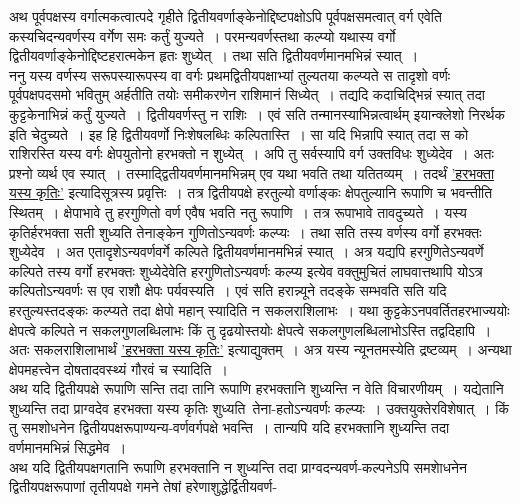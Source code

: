 \documentclass[11pt, openany]{book}
\begin{document}
\newpage

\begin{sloppypar}
अथ पूर्वपक्षस्य वर्गात्मकत्वात्पदे गृहीते द्वितीयवर्णाङ्केनोद्दिष्टपक्षोऽपि पूर्वपक्षसमत्वात् वर्ग एवेति कस्यचिदन्यवर्णस्य वर्गेण समः कर्तुं युज्यते~। परमन्यवर्णस्तथा कल्प्यो यथास्य वर्गो द्वितीयवर्णाङ्केनोद्दिष्टहरात्मकेन हृतः शुध्येत्~। तथा सति द्वितीयवर्णमानमभिन्नं स्यात्~।\\

ननु यस्य वर्णस्य सरूपस्यारूपस्य वा वर्गः प्रथमद्वितीयपक्षाभ्यां तुल्यतया कल्प्यते स तादृशो वर्णः पूर्वपक्षपदसमो भवितुम् अर्हतीति तयोः समीकरणेन राशिमानं सिध्येत्~। तद्यदि कदाचिद्भिन्नं स्यात् तदा कुट्टकेनाभिन्नं कर्तुं युज्यते~। द्वितीयवर्णस्तु न राशिः~। एवं सति तन्मानस्याभिन्नत्वार्थम् इयान्क्लेशो निरर्थक इति चेदुच्यते~। इह हि द्वितीयवर्णो निःशेषलब्धिः कल्पितास्ति~। सा यदि भिन्नापि स्यात् तदा स को राशिरस्ति यस्य वर्गः क्षेपयुतोनो हरभक्तो न शुध्येत्~। अपि तु सर्वस्यापि वर्ग उक्तविधः शुध्येदेव~। अतः प्रश्नो व्यर्थ एव स्यात्~। तस्माद्द्वितीयवर्णमानमभिन्नम् एव यथा भवति तथा यतितव्यम्~। तदर्थं \hyperref[10.176]{'हरभक्ता यस्य कृतिः'} इत्यादिसूत्रस्य प्रवृत्तिः~। तत्र द्वितीयपक्षे हरतुल्यो वर्णाङ्कः क्षेपतुल्यानि रूपाणि च भवन्तीति स्थितम्~। क्षेपाभावे तु हरगुणितो वर्ण एवैष भवति नतु रूपाणि~। तत्र रूपाभावे तावदुच्यते~। यस्य कृतिर्हरभक्ता सती शुध्यति तेनाङ्केन गुणितोऽन्यवर्णः कल्प्यः~। तथा सति तस्य वर्णस्य वर्गो हरभक्तः शुध्येदेव~। अत एतादृशेऽन्यवर्णवर्गे कल्पिते द्वितीयवर्णमानमभिन्नं स्यात्~। अत्र यद्यपि हरगुणितेऽन्यवर्णे कल्पिते तस्य वर्गो हरभक्तः शुध्येदेवेति हरगुणितोऽन्यवर्णः कल्प्य इत्येव वक्तुमुचितं लाघवात्तथापि योऽत्र कल्पितोऽन्यवर्णः स एव राशौ क्षेपः पर्यवस्यति~। एवं सति हरान्न्यूने तदङ्के सम्भवति सति यदि हरतुल्यस्तदङ्कः कल्प्यते तदा क्षेपो महान् स्यादिति न सकलराशिलाभः~। यथा कुट्टकेऽनपवर्तितहरभाज्ययोः क्षेपत्वे कल्पिते न सकलगुणलब्धिलाभः किं तु दृढयोस्तयोः क्षेपत्वे सकलगुणलब्धिलाभोऽस्ति तद्वदिहापि~। अतः सकलराशिलाभार्थं \hyperref[10.176]{'हरभक्ता यस्य कृतिः'} इत्याद्युक्तम्~। अत्र यस्य न्यूनतमस्येति द्रष्टव्यम्~। अन्यथा क्षेपमहत्त्वेन दोषतादवस्थ्यं गौरवं च स्यादिति~।\\

अथ यदि द्वितीयपक्षे रूपाणि सन्ति तदा तानि रूपाणि हरभक्तानि शुध्यन्ति न वेति विचारणीयम्~। यद्येतानि शुध्यन्ति तदा प्राग्वदेव हरभक्ता यस्य कृतिः शुध्यति~तेना-हतोऽन्यवर्णः कल्प्यः~। उक्तयुक्तेरविशेषात्~। किं तु समशोधनेन द्वितीयपक्षरूपाण्यन्य-वर्णवर्गपक्षे भवन्ति~। तान्यपि यदि हरभक्तानि शुध्यन्ति तदा वर्णमानमभिन्नं सिद्धमेव~। \\

अथ यदि द्वितीयपक्षगतानि रूपाणि हरभक्तानि न शुध्यन्ति तदा प्राग्वदन्यवर्ण-कल्पनेऽपि समशेाधनेन द्वितीयपक्षरूपाणां तृतीयपक्षे गमने तेषां हरेणाशुद्धेर्द्वितीयवर्ण-
\end{sloppypar}
\end{document}
